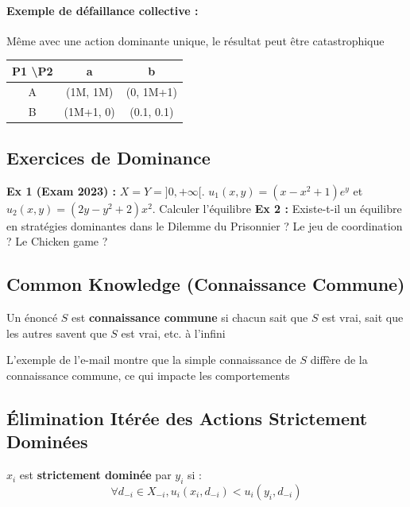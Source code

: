 \paragraph{Exemple de défaillance collective :} Même avec une action dominante unique, le résultat peut être catastrophique %
\begin{center}
\begin{tabular}{c|c|c}
P1 \textbackslash P2 & a & b \\ \hline
A & (1M, 1M) & (0, 1M+1) \\ \hline
B & (1M+1, 0) & (0.1, 0.1)
\end{tabular} %
\end{center}

\subsection{Exercices de Dominance} %
\textbf{Ex 1 (Exam 2023) :} $X = Y = ]0, +\infty[$. $u_1(x,y) = (x-x^2+1)e^y$ et $u_2(x,y) = (2y-y^2+2)x^2$. Calculer l'équilibre %
\textbf{Ex 2 :} Existe-t-il un équilibre en stratégies dominantes dans le Dilemme du Prisonnier ? Le jeu de coordination ? Le Chicken game ? %

\subsection{Common Knowledge (Connaissance Commune)} %
\begin{definition}
Un énoncé $S$ est \textbf{connaissance commune} si chacun sait que $S$ est vrai, sait que les autres savent que $S$ est vrai, etc. à l'infini %
\end{definition}
L'exemple de l'e-mail montre que la simple connaissance de $S$ diffère de la connaissance commune, ce qui impacte les comportements %

\subsection{Élimination Itérée des Actions Strictement Dominées} %

\begin{definition}
$x_i$ est \textbf{strictement dominée} par $y_i$ si : %
$$\forall d_{-i} \in X_{-i}, u_i(x_i, d_{-i}) < u_i(y_i, d_{-i})$$ %
\end{definition}

